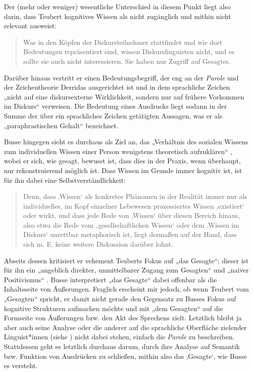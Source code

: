 Der (mehr oder weniger) wesentliche Unterschied in diesem Punkt liegt also darin, dass Teubert kognitives Wissen als nicht zugänglich und mithin nicht relevant ausweist:

\begin{quote}
Was in den Köpfen der Diskursteilnehmer stattfindet und wie dort Bedeutungen repräsentiert sind, wissen Diskurslinguisten nicht, und es sollte sie auch nicht interessieren. Sie haben nur Zugriff auf Gesagtes. \autocite[84]{teubertWirklichkeitDiskurses2013}
\end{quote}

Darüber hinaus vertritt er einen Bedeutungsbegriff, der eng an der \emph{Parole} und der Zeichentheorie Derridas ausgerichtet ist und in dem sprachliche Zeichen „nicht auf eine diskursexterne Wirklichkeit, sondern nur auf frühere Vorkommen im Diskurs`` \autocite[84]{teubertWirklichkeitDiskurses2013} verweisen. Die Bedeutung eines Ausdrucks liegt sodann in der Summe der über ein sprachliches Zeichen getätigten Aussagen, was er als „paraphrastischen Gehalt`` \autocite[69]{teubertWirklichkeitDiskurses2013} bezeichnet.

Busse hingegen sieht es durchaus als Ziel an, das „Verhältnis des sozialen Wissens zum individuellen Wissen einer Person wenigstens theoretisch aufzuklären`` \autocite[169]{busseDiskursSpracheGesellschaftliches2013}, wobei er sich, wie gesagt, bewusst ist, dass dies in der Praxis, wenn überhaupt, nur rekonstruierend möglich ist. Dass Wissen im Grunde immer kognitiv ist, ist für ihn dabei eine Selbstverständlichkeit:

\begin{quote}
Denn, dass ‚Wissen` als konkretes Phänomen in der Realität immer nur als individuelles, im Kopf einzelner Lebewesen prozessiertes Wissen ‚existiert` oder wirkt, und dass jede Rede von ‚Wissen` über diesen Bereich hinaus, also etwa die Rede vom ‚gesellschaftlichen Wissen` oder dem ‚Wissen im Diskurs` unrettbar metaphorisch ist, liegt dermaßen auf der Hand, dass sich m. E. keine weitere Diskussion darüber lohnt. \autocite[169]{busseDiskursSpracheGesellschaftliches2013}
\end{quote}

Abseits dessen kritisiert er vehement Teuberts Fokus auf „das Gesagte``; dieser ist für ihn ein „angeblich direkter, unmittelbarer Zugang zum Gesagten`` und „naiver Positivismus`` \autocite[170]{busseDiskursSpracheGesellschaftliches2013}. Busse interpretiert „das Gesagte`` dabei offenbar als die Inhaltsseite von Äußerungen. Fraglich erscheint mir jedoch, ob wenn Teubert vom „Gesagten`` spricht, er damit nicht gerade den Gegensatz zu Busses Fokus auf kognitive Strukturen aufmachen möchte und mit „dem Gesagten`` auf die Formseite von Äußerungen bzw. den Akt des Sprechens zielt. Letztlich bleibt ja aber auch seine Analyse oder die anderer auf die sprachliche Oberfläche zielender Linguist*innen (siehe ) nicht dabei stehen, einfach die \emph{Parole} zu beschreiben. Stattdessen geht es letztlich durchaus darum, durch ihre Analyse auf Semantik bzw. Funktion von Ausdrücken zu schließen, mithin also das ‚Gesagte`, wie Busse es versteht.

